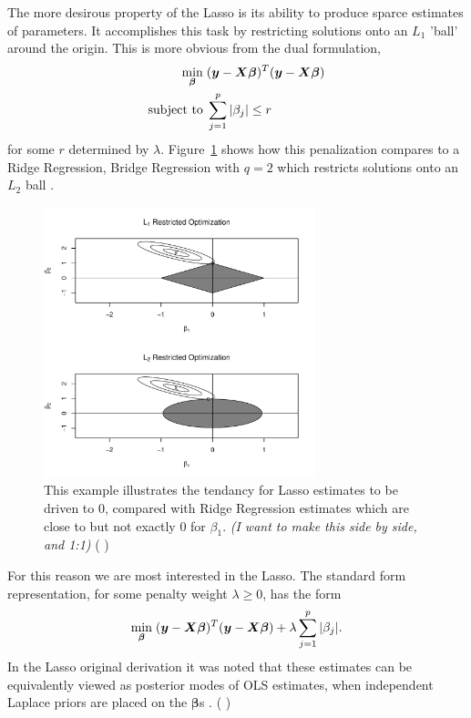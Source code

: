 \documentclass{uwstat572}
\newcommand{\vmcomment}[1]{({\color{blue}{VM's comment:}} \textbf{\color{blue}{#1}})}
\begin{document}
The more desirous property of the Lasso is its ability to produce sparce estimates of parameters. It accomplishes this task by restricting solutions onto an $L_1$ 'ball' around the origin. This is more obvious from the dual formulation, 
\begin{align*}
\min_{\boldsymbol{\beta}}  \hspace{.1cm} &(\boldsymbol{y}-\boldsymbol{X}\boldsymbol{\beta})^T(\boldsymbol{y}-\boldsymbol{X}\boldsymbol{\beta})\\
\text{subject to} \hspace{.1cm}&\sum_{j=1}^p|\beta_j|\leq r
\end{align*}
for some $r$ determined by $\lambda$. Figure~\ref{LassoPlot} shows how this penalization compares to a Ridge Regression, Bridge Regression with $q=2$ which restricts solutions onto an $L_2$ ball \citep{park2008bayesian}.

\begin{figure}\label{LassoPlot}
  \centering
    \includegraphics[width=0.7\textwidth]{LassoPlot.pdf}
  \caption{This example illustrates the tendancy for Lasso estimates to be driven to 0, compared with Ridge Regression estimates which are close to but not exactly 0 for $\beta_1$. \emph{\color{red} (I want to make this side by side, and 1:1)\color{black}} 
  \vmcomment{This picture needs explanation of what all the geometric objects mean in reference to the regression problem.}}
\end{figure}

For this reason we are most interested in the Lasso. The standard form representation, for some penalty weight $\lambda \geq 0$, has the form \[
\min_{\boldsymbol{\beta}}  \hspace{.1cm} (\boldsymbol{y}-\boldsymbol{X}\boldsymbol{\beta})^T(\boldsymbol{y}-\boldsymbol{X}\boldsymbol{\beta})+\lambda\sum_{j=1}^p|\beta_j|.
\] In the Lasso original derivation it was noted that these estimates can be equivalently viewed as posterior modes of OLS estimates, when independent Laplace priors are placed on the $\boldsymbol{\beta}$s \cite{tibshirani1996regression}.
\vmcomment{OLS estimates do not have posterior distributions, and no posterior modes too.}
\end{document}
